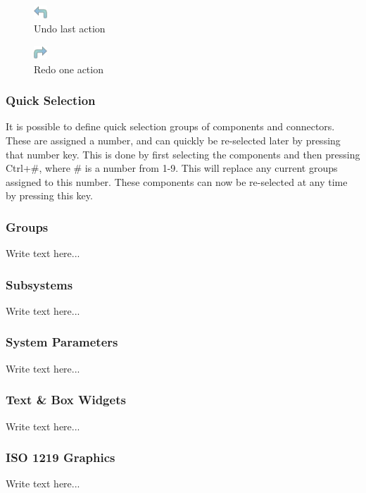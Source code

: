 \begin{figure}
  \includegraphics[width=5mm]
    {../../HopsanGUI/graphics/uiicons/Hopsan-Undo.png}
  \caption*{Undo last action}
\end{figure} 


\begin{figure}
  \includegraphics[width=5mm]
    {../../HopsanGUI/graphics/uiicons/Hopsan-Redo.png}
  \caption*{Redo one action}
\end{figure} 


\subsubsection{Quick Selection}
It is possible to define quick selection groups of components and connectors. These are assigned a number, and can quickly be re-selected later by pressing that number key. This is done by first selecting the components and then pressing Ctrl+\#, where \# is a number from 1-9. This will replace any current groups assigned to this number. These components can now be re-selected at any time by pressing this key. 

\subsubsection{Groups}
Write text here...

\subsubsection{Subsystems}
Write text here...

\subsubsection{System Parameters}
Write text here...

\subsubsection{Text \& Box Widgets}
Write text here...

\subsubsection{ISO 1219 Graphics}
Write text here...

